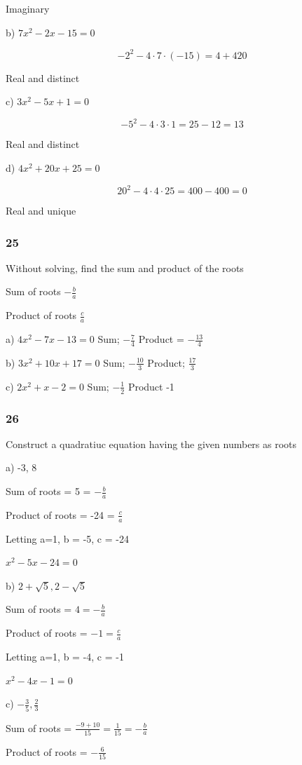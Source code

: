 \documentclass[]{report}
\begin{document}
Imaginary

b) $7x^2 -2x - 15 = 0$

\[
-2^2 - 4\cdot7\cdot(-15)  = 4 + 420
\]

Real and distinct

c) $3x^2 -5x +1 = 0$

\[
-5^2 - 4\cdot3\cdot1 = 25 -12 = 13
\]

Real and distinct

d) $4x^2 + 20x + 25 = 0$

\[
20^2 - 4\cdot4\cdot25 = 400 - 400 = 0
\]

Real and unique

\subsubsection{25}
Without solving, find the sum and product of the roots 

Sum of roots $-\frac{b}{a}$

Product of roots $\frac{c}{a}$

a) $4x^2 - 7x -13 = 0$
Sum; $-\frac{7}{4}$
Product = $-\frac{13}{4}$

b) $3x^2 + 10x + 17 = 0$
Sum; $-\frac{10}{3}$
Product; $\frac{17}{3}$


c) $2x^2 + x - 2 = 0$
Sum; $-\frac{1}{2}$
Product -1

\subsubsection{26}

Construct a quadratiuc equation having the given numbers as roots

a) -3, 8

Sum of roots = 5  = $-\frac{b}{a}$

Product of roots = -24 = $\frac{c}{a}$

Letting a=1, b = -5, c = -24

$x^2- 5x -24 = 0$

b) $2 + \sqrt{5}, 2 - \sqrt{5}$

Sum of roots = $4 = -\frac{b}{a}$

Product of roots = $-1 = \frac{c}{a}$

Letting a=1, b = -4, c = -1

$x^2 - 4x -1 = 0$

c) $-\frac{3}{5}, \frac{2}{3}$

Sum of roots = $ \frac{-9 + 10}{15} = \frac{1}{15} = -\frac{b}{a}$

Product of roots = $-\frac{6}{15}$
\end{document}
